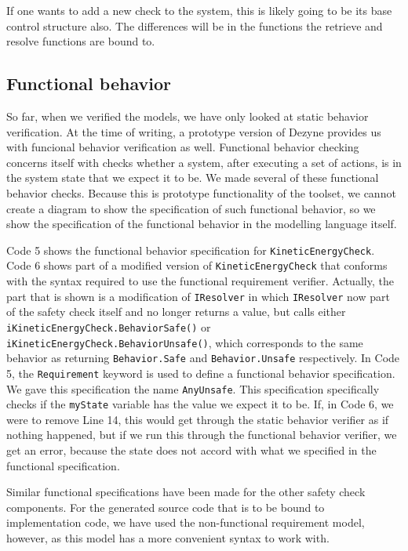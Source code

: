 \documentclass[12pt]{scrreprt}
\begin{document}
\begin{appendices}
If one wants to add a new check to the system, this is likely going to be its base control structure also. The differences will be in the functions the retrieve and resolve functions are bound to.

\subsection{Functional behavior}
So far, when we verified the models, we have only looked at static behavior verification. At the time of writing, a prototype version of Dezyne provides us with funcional behavior verification as well. Functional behavior checking concerns itself with checks whether a system, after executing a set of actions, is in the system state that we expect it to be. We made several of these functional behavior checks. Because this is prototype functionality of the toolset, we cannot create a diagram to show the specification of such functional behavior, so we show the specification of the functional behavior in the modelling language itself.
\par
Code 5 shows the functional behavior specification for \texttt{KineticEnergyCheck}. Code 6 shows part of a modified version of \texttt{KineticEnergyCheck} that conforms with the syntax required to use the functional requirement verifier. Actually, the part that is shown is a modification of \texttt{IResolver} in which \texttt{IResolver} now part of the safety check itself and no longer returns a value, but calls either \texttt{iKineticEnergyCheck.BehaviorSafe()} or \texttt{iKineticEnergyCheck.BehaviorUnsafe()}, which corresponds to the same behavior as returning \texttt{Behavior.Safe} and \texttt{Behavior.Unsafe} respectively. In Code 5, the \texttt{Requirement} keyword is used to define a functional behavior specification. We gave this specification the name \texttt{AnyUnsafe}. This specification specifically checks if the \texttt{myState} variable has the value we expect it to be. If, in Code 6, we were to remove Line 14, this would get through the static behavior verifier as if nothing happened, but if we run this through the functional behavior verifier, we get an error, because the state does not accord with what we specified in the functional specification.


Similar functional specifications have been made for the other safety check components. For the generated source code that is to be bound to implementation code, we have used the non-functional requirement model, however, as this model has a more convenient syntax to work with.


\end{appendices}
\end{document}
